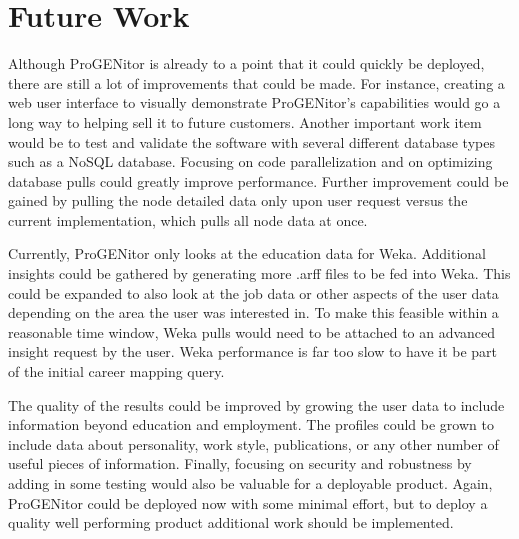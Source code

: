 \section{Future Work}
\label{sect:future-work}
Although ProGENitor is already to a point that it could quickly be deployed,
there are still a lot of improvements that could be made.  For
instance, creating a web user interface to visually demonstrate ProGENitor's
capabilities would go a long way to helping sell it to future customers. 
Another important work item would be to test and validate the software with
several different database types such as a NoSQL database.  Focusing on code
parallelization and on optimizing database pulls could greatly improve
performance.  Further improvement could be gained by pulling the node detailed
data only upon user request versus the current implementation, which pulls all
node data at once.

Currently, ProGENitor only looks at the education data for Weka.  Additional
insights could be gathered by generating more .arff files to be fed into
Weka.  This could be expanded to also look at the job data or other aspects of
the user data depending on the area the user was interested in.  To make this
feasible within a reasonable time window, Weka pulls would need to be attached
to an advanced insight request by the user.  Weka performance is far too slow to
have it be part of the initial career mapping query.

The quality of the results could be improved by growing the user data to include
information beyond education and employment.  The profiles could be grown to
include data about personality, work style, publications, or any other number of
useful pieces of information.  Finally, focusing on security and robustness by
adding in some testing would also be valuable for a deployable product.  Again,
ProGENitor could be deployed now with some minimal effort, but to deploy a
quality well performing product additional work should be implemented.
